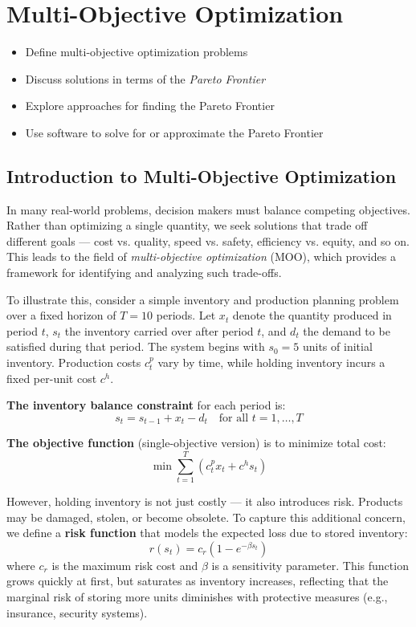 \chapter{Multi-Objective Optimization}

\begin{outcome}
\begin{itemize}
    \item Define multi-objective optimization problems
    \item Discuss solutions in terms of the \emph{Pareto Frontier}
    \item Explore approaches for finding the Pareto Frontier
    \item Use software to solve for or approximate the Pareto Frontier
\end{itemize}
\end{outcome}

\section{Introduction to Multi-Objective Optimization}

In many real-world problems, decision makers must balance competing objectives. Rather than optimizing a single quantity, we seek solutions that trade off different goals — cost vs. quality, speed vs. safety, efficiency vs. equity, and so on. This leads to the field of \emph{multi-objective optimization} (MOO), which provides a framework for identifying and analyzing such trade-offs.

To illustrate this, consider a simple inventory and production planning problem over a fixed horizon of \(T = 10\) periods. Let \(x_t\) denote the quantity produced in period \(t\), \(s_t\) the inventory carried over after period \(t\), and \(d_t\) the demand to be satisfied during that period. The system begins with \(s_0 = 5\) units of initial inventory. Production costs \(c^p_t\) vary by time, while holding inventory incurs a fixed per-unit cost \(c^h\).

\textbf{The inventory balance constraint} for each period is:
\[
s_t = s_{t-1} + x_t - d_t \quad \text{for all } t = 1,\ldots,T
\]

\textbf{The objective function} (single-objective version) is to minimize total cost:
\[
\min \sum_{t=1}^{T} \left( c^p_t x_t + c^h s_t \right)
\]

However, holding inventory is not just costly — it also introduces risk. Products may be damaged, stolen, or become obsolete. To capture this additional concern, we define a \textbf{risk function} that models the expected loss due to stored inventory:
\[
r(s_t) = c_r \left(1 - e^{-\beta s_t}\right)
\]
where \(c_r\) is the maximum risk cost and \(\beta\) is a sensitivity parameter. This function grows quickly at first, but saturates as inventory increases, reflecting that the marginal risk of storing more units diminishes with protective measures (e.g., insurance, security systems).

